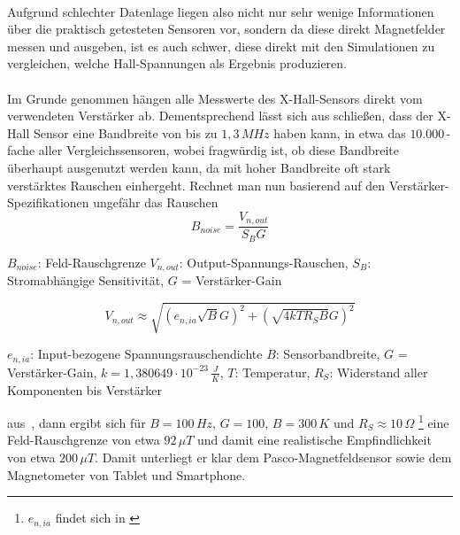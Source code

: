 \documentclass[12pt, a4paper]{article}
\renewcommand{\footnotesize}{\fontsize{10pt}{12pt}\selectfont}
\begin{document}
\paragraph{}

Aufgrund schlechter Datenlage liegen also nicht nur sehr wenige Informationen über die praktisch getesteten Sensoren vor, sondern da diese direkt Magnetfelder messen und ausgeben, ist es auch schwer, diese direkt mit den Simulationen zu vergleichen, welche Hall-Spannungen als Ergebnis produzieren.\paragraph{}
Im Grunde genommen hängen alle Messwerte des X-Hall-Sensors direkt vom verwendeten Verstärker ab. Dementsprechend lässt sich aus \cite{texInsAmp} schließen, dass der X-Hall Sensor eine Bandbreite von bis zu $1,3\,MHz$ haben kann, in etwa das $10.000\,$-fache aller Vergleichssensoren, wobei fragwürdig ist, ob diese Bandbreite überhaupt ausgenutzt werden kann, da mit hoher Bandbreite oft stark verstärktes Rauschen einhergeht.\newline
Rechnet man nun basierend auf den Verstärker-Spezifikationen ungefähr das Rauschen
\begin{equation}
	B_{noise}=\frac{V_{n,out}}{S_BG}
	\tag{5.2}
	\label{5.2}
\end{equation}

\vspace{-0.8em}
\begin{center}
	\footnotesize
	$B_{noise}$: Feld-Rauschgrenze $V_{n,out}$: Output-Spannungs-Rauschen, $S_B$: Stromabhängige Sensitivität, \newline
	$G$ = Verstärker-Gain
\end{center}

\begin{equation}
	V_{n,out}\approx\sqrt{(e_{n,ia}\sqrt{B}G)^2+(\sqrt{4kTR_SB}G)^2}
	\tag{5.3}
	\label{5.3}
\end{equation}

\vspace{-0.8em}
\begin{center}
	\footnotesize
	$e_{n,ia}$: Input-bezogene Spannungsrauschendichte $B$: Sensorbandbreite, $G$ = Verstärker-Gain, $k=1,380649\cdot10^{-23}\,\frac{J}{K}$, $T$: Temperatur, $R_S$: Widerstand aller Komponenten bis Verstärker
\end{center}
aus\,\cite{analogNoise1}\,\cite{analogNoise2}\,\cite{analogNoise3}, dann ergibt sich für $B=100\,Hz$, $G=100$, $B=300\,K$ und $R_S\approx10\,\Omega$ \footnote{$e_{n,ia}$ findet sich in \cite{texInsAmp}} eine Feld-Rauschgrenze von etwa $92\,\mu{T}$ und damit eine realistische Empfindlichkeit von etwa $200\,\mu{T}$.
Damit unterliegt er klar dem Pasco-Magnetfeldsensor sowie dem Magnetometer von Tablet und Smartphone.
\end{document}
